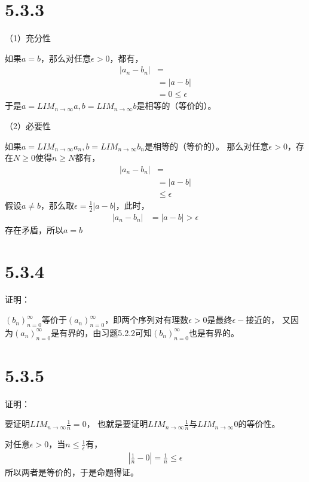 \documentclass{article}
\theoremstyle{mystyle}
\begin{document}
\section*{5.3.3}

（1）充分性

如果$a=b$，那么对任意$\epsilon > 0$，都有，
\begin{align*}
  |a_n - b_n| & =                 \\
              & = |a-b|           \\
              & = 0 \leq \epsilon
\end{align*}
于是$a=LIM_{n \rightarrow \infty}a,b=LIM_{n \rightarrow \infty}b$是相等的（等价的）。

（2）必要性

如果$a=LIM_{n \rightarrow \infty}a_n, b=LIM_{n \rightarrow \infty}b_n$是相等的（等价的）。
那么对任意$\epsilon > 0$，存在$N \geq 0$使得$n \geq N$都有，
\begin{align*}
  |a_n - b_n| & =             \\
              & = |a-b|       \\
              & \leq \epsilon
\end{align*}
假设$a \neq b$，那么取$\epsilon = \frac{1}{2}|a-b|$，此时，
\begin{align*}
  |a_n - b_n| & =  |a-b| > \epsilon
\end{align*}
存在矛盾，所以$a=b$

\section*{5.3.4}

证明：

$(b_n)_{n=0}^\infty$等价于$(a_n)_{n=0}^\infty$，即两个序列对有理数$\epsilon > 0$是最终$\epsilon -$接近的，
又因为$(a_n)_{n=0}^\infty$是有界的，由习题5.2.2可知$(b_n)_{n=0}^\infty$也是有界的。


\section*{5.3.5}

证明：

要证明$LIM_{n \rightarrow \infty}\frac{1}{n} = 0$，
也就是要证明$LIM_{n \rightarrow \infty}\frac{1}{n}$与$LIM_{n \rightarrow \infty}0$的等价性。

对任意$\epsilon > 0$，当$n \leq \frac{1}{\epsilon}$有，
\begin{align*}
  |\frac{1}{n} - 0| = \frac{1}{n} \leq \epsilon
\end{align*}
所以两者是等价的，于是命题得证。
\end{document}
